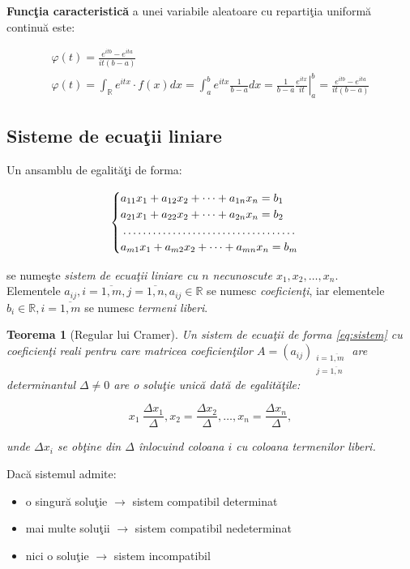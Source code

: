 \documentclass[12pt]{article}
\newtheorem{theorem}{Teorema}
\begin{document}
\textbf{Funcţia caracteristică} a unei variabile aleatoare cu repartiţia uniformă continuă este:

\begin{gather*}
	\varphi(t) = \frac{e^{itb} - e^{ita}}{it(b-a)} \\
	\varphi(t) = \int_{\mathbb{R}} e^{itx} \cdot f(x) dx = \int_a^b e^{itx} \frac{1}{b - a} dx = \frac{1}{b - a} \left. \frac{e^{itx}}{it} \right|_a^b = \frac{e^{itb} - e^{ita}}{it(b-a)}
\end{gather*}

\subsection*{Sisteme de ecuaţii liniare}

Un ansamblu de egalităţi de forma:

\begin{equation} \label{eq:sistem}
	\begin{cases}
		a_{11}x_1 + a_{12}x_2 + \dots + a_{1n}x_n = b_1 \\
		a_{21}x_1 + a_{22}x_2 + \dots + a_{2n}x_n = b_2 \\
		\dotfill \\
		a_{m1}x_1 + a_{m2}x_2 + \dots + a_{mn}x_n = b_m 
	\end{cases}
\end{equation}

se numeşte \textit{sistem de ecuaţii liniare cu $n$ necunoscute $x_1, x_2, \dots, x_n$}.\\
Elementele $a_{ij}, i=\overline{1,m}, j=\overline{1,n}, a_{ij} \in \mathbb{R}$ se numesc \textit{coeficienţi}, iar elementele $b_i \in \mathbb{R}, i=\overline{1,m}$ se numesc \textit{termeni liberi}.

\begin{theorem}[Regular lui Cramer]
	Un sistem de ecuaţii de forma \eqref{eq:sistem} cu coeficienţi reali pentru care matricea coeficienţilor $A = (a_{ij})_{\substack{i=\overline{1,m} \\ j=\overline{1,n}}}$ are determinantul $\Delta \neq 0$ are o soluţie unică dată de egalităţile:

	\[
		x_1 \ \frac{\Delta x_1}{\Delta}, x_2 = \frac{\Delta x_2}{\Delta}, \dots, x_n = \frac{\Delta x_n}{\Delta},
	\]

\noindent unde $\Delta x_i$ se obţine din $\Delta$ înlocuind coloana $i$ cu coloana termenilor liberi.
\end{theorem}

Dacă sistemul admite:

\begin{itemize}
	\item o singură soluţie $\to$ sistem compatibil determinat
	\item mai multe soluţii $\to$ sistem compatibil nedeterminat
	\item nici o soluţie $\to$ sistem incompatibil
\end{itemize}
\end{document}
